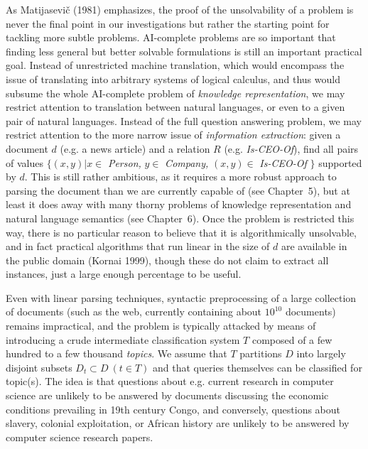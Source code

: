 \smallskip\noindent As Matijasevi\v{c} (1981)\nocite{Matijasevic:1981}
emphasizes, the proof of the unsolvability of a problem is never the final
point in our investigations but rather the starting point for tackling more
subtle problems. AI-complete problems are so important that finding less
general but better solvable formulations is still an important practical
goal. Instead of unrestricted machine translation, which would encompass the
issue of translating into arbitrary systems of logical calculus, and thus
would subsume the whole AI-complete problem of {\sl knowledge representation},
we may restrict attention to translation between natural languages, or even to
a given pair of natural languages.  
Instead of the full question answering problem, we may restrict attention to
the more narrow issue of {\it information extraction}: given a document $d$
(e.g. a news article) and a relation $R$ (e.g. {\it Is-CEO-Of}), find all
pairs of values $\{(x,y)|x\in$ {\it Person,} $y\in$ {\it Company,} $(x,y) \in$
{\it Is-CEO-Of} $\}$ supported by $d$.  This is
still rather ambitious, as it requires a more robust approach to parsing the
document than we are currently capable of (see Chapter~5), but at least it
does away with many thorny problems of knowledge representation and natural
language semantics (see Chapter~6). Once the problem is restricted this way,
there is no particular reason to believe that it is algorithmically
unsolvable, and in fact practical algorithms that run linear in the size of
$d$ are available in the public domain (Kornai 1999), though these do not
claim to extract all instances, just a large enough percentage to be useful.

Even with linear parsing techniques, syntactic preprocessing of a large
collection of documents (such as the web, currently containing about $10^{10}$
documents) remains impractical, and the problem is typically attacked by means
of introducing a crude intermediate classification system $T$ composed of a
few hundred to a few thousand {\it topics}. We assume that $T$ partitions $D$
into largely disjoint subsets $D_t \subset D \  (t\in T)$ and that queries
themselves can be classified for topic(s). The idea is that questions about
e.g. current research in computer science are unlikely to be answered by
documents discussing the economic conditions prevailing in 19th century Congo,
and conversely, questions about slavery, colonial exploitation, or African
history are unlikely to be answered by computer science research papers. 
 

